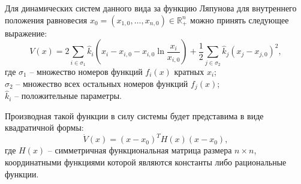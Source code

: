 \documentclass[14pt,a4paper]{extarticle}
\begin{document}
	\begin{theorem}
		Для динамических систем данного  вида за функцию Ляпунова для внутреннего положения равновесия $x_0=(x_{1,0},\dots,x_{n,0})\in\mathbb{R}^n_{+}$ можно принять следующее выражение:
		\[V(x)=2\sum\limits_{i\in\sigma_1}\hat{k}_i(x_i-x_{i,0}-x_{i,0}\ln\dfrac{x_i}{x_{i,0}})+\dfrac{1}{2}\sum\limits_{j\in\sigma_2}\hat{k}_j(x_j-x_{j,0})^2,\]
		где $\sigma_1$ -- множество номеров функций $f_i(x)$ кратных $x_i$;\\ 
		$\sigma_2$ -- множество всех остальных номеров функций $f_j(x)$;\\
		$\hat{k}_i$ -- положительные параметры. 
		
		Производная такой функции в силу системы будет представима в виде квадратичной формы:
		\[\dot{V}(x)=(x-x_0)^{T}H(x)(x-x_0),\]
		где $H(x)$ -- симметричная функциональная матрица размера $n\times n$, координатными функциями которой являются константы либо рациональные функции. 
	\end{theorem}
\end{document}
